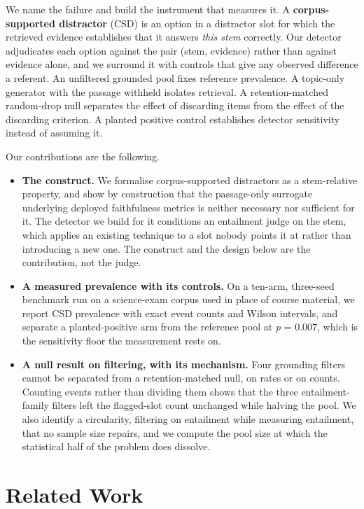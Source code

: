 \documentclass[11pt]{article}
\begin{document}
We name the failure and build the instrument that measures it. A \textbf{corpus-supported distractor} (CSD) is an option in a distractor slot for which the retrieved evidence establishes that it answers \emph{this stem} correctly. Our detector adjudicates each option against the pair (stem, evidence) rather than against evidence alone, and we surround it with controls that give any observed difference a referent. An unfiltered grounded pool fixes reference prevalence. A topic-only generator with the passage withheld isolates retrieval. A retention-matched random-drop null separates the effect of discarding items from the effect of the discarding criterion. A planted positive control establishes detector sensitivity instead of assuming it.

Our contributions are the following.

\begin{itemize}
\item \textbf{The construct.} We formalise corpus-supported distractors as a stem-relative property, and show by construction that the passage-only surrogate underlying deployed faithfulness metrics is neither necessary nor sufficient for it. The detector we build for it conditions an entailment judge on the stem, which applies an existing technique to a slot nobody points it at rather than introducing a new one. The construct and the design below are the contribution, not the judge.
\item \textbf{A measured prevalence with its controls.} On a ten-arm, three-seed benchmark run on a science-exam corpus used in place of course material, we report CSD prevalence with exact event counts and Wilson intervals, and separate a planted-positive arm from the reference pool at \emph{p} = 0.007, which is the sensitivity floor the measurement rests on.
\item \textbf{A null result on filtering, with its mechanism.} Four grounding filters cannot be separated from a retention-matched null, on rates or on counts. Counting events rather than dividing them shows that the three entailment-family filters left the flagged-slot count unchanged while halving the pool. We also identify a circularity, filtering on entailment while measuring entailment, that no sample size repairs, and we compute the pool size at which the statistical half of the problem does dissolve.
\end{itemize}

\section{Related Work}
\end{document}
